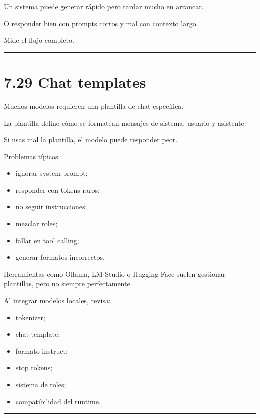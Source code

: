 Un sistema puede generar rápido pero tardar mucho en arrancar.

O responder bien con prompts cortos y mal con contexto largo.

Mide el flujo completo.

\begin{center}\rule{0.5\linewidth}{0.5pt}\end{center}

\section{7.29 Chat templates}\label{chat-templates}

Muchos modelos requieren una plantilla de chat específica.

La plantilla define cómo se formatean mensajes de sistema, usuario y
asistente.

Si usas mal la plantilla, el modelo puede responder peor.

Problemas típicos:

\begin{itemize}
\tightlist
\item
  ignorar system prompt;
\item
  responder con tokens raros;
\item
  no seguir instrucciones;
\item
  mezclar roles;
\item
  fallar en tool calling;
\item
  generar formatos incorrectos.
\end{itemize}

Herramientas como Ollama, LM Studio o Hugging Face suelen gestionar
plantillas, pero no siempre perfectamente.

Al integrar modelos locales, revisa:

\begin{itemize}
\tightlist
\item
  tokenizer;
\item
  chat template;
\item
  formato instruct;
\item
  stop tokens;
\item
  sistema de roles;
\item
  compatibilidad del runtime.
\end{itemize}

\begin{center}\rule{0.5\linewidth}{0.5pt}\end{center}

